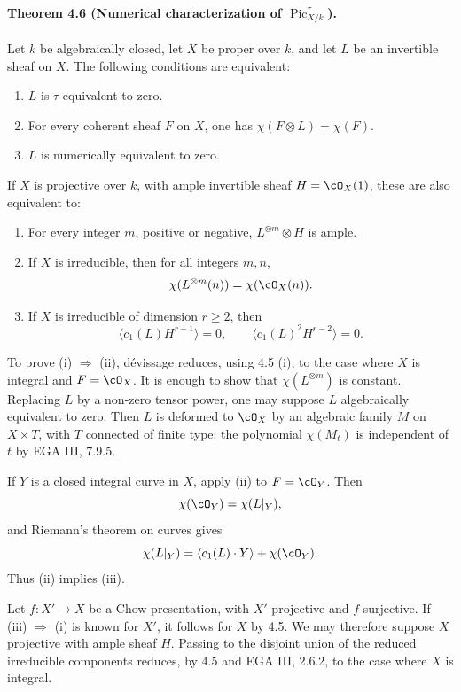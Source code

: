 \documentclass[11pt]{article}
\theoremstyle{plain}
\theoremstyle{definition}
\theoremstyle{remark}
\DeclareMathOperator{\Pic}{Pic}
\begin{document}
\paragraph{Theorem 4.6 (Numerical characterization of $\Pic^\tau_{X/k}$).}
Let $k$ be algebraically closed, let $X$ be proper over $k$, and let $L$ be an invertible sheaf on $X$. The following conditions are equivalent:
\begin{enumerate}[label=\roman*)]
\item $L$ is $\tau$-equivalent to zero.
\item For every coherent sheaf $F$ on $X$, one has $\chi(F\otimes L)=\chi(F)$.
\item $L$ is numerically equivalent to zero.
\end{enumerate}
If $X$ is projective over $k$, with ample invertible sheaf $H=\cO_X(1)$, these are also equivalent to:
\begin{enumerate}[label=\roman*),resume]
\item For every integer $m$, positive or negative, $L^{\otimes m}\otimes H$ is ample.
\item If $X$ is irreducible, then for all integers $m,n$,
\[
\chi(L^{\otimes m}(n))=\chi(\cO_X(n)).
\]
\item If $X$ is irreducible of dimension $r\geq 2$, then
\[
\langle c_1(L)H^{r-1}\rangle=0,\qquad
\langle c_1(L)^2H^{r-2}\rangle=0.
\]
\end{enumerate}

To prove (i) $\Rightarrow$ (ii), dévissage reduces, using 4.5 (i), to the case where $X$ is integral and $F=\cO_X$. It is enough to show that $\chi(L^{\otimes m})$ is constant. Replacing $L$ by a non-zero tensor power, one may suppose $L$ algebraically equivalent to zero. Then $L$ is deformed to $\cO_X$ by an algebraic family $M$ on $X\times T$, with $T$ connected of finite type; the polynomial $\chi(M_t)$ is independent of $t$ by EGA III, 7.9.5.

If $Y$ is a closed integral curve in $X$, apply (ii) to $F=\cO_Y$. Then
\[
\chi(\cO_Y)=\chi(L|_Y),
\]
and Riemann's theorem on curves gives
\[
\chi(L|_Y)=\langle c_1(L)\cdot Y\rangle+\chi(\cO_Y).
\]
Thus (ii) implies (iii).

Let $f:X'\to X$ be a Chow presentation, with $X'$ projective and $f$ surjective. If (iii) $\Rightarrow$ (i) is known for $X'$, it follows for $X$ by 4.5. We may therefore suppose $X$ projective with ample sheaf $H$. Passing to the disjoint union of the reduced irreducible components reduces, by 4.5 and EGA III, 2.6.2, to the case where $X$ is integral.
\end{document}
